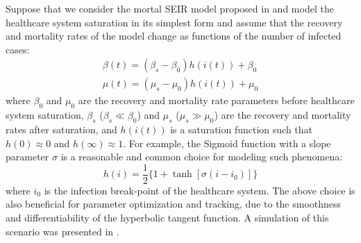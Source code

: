\documentclass[journal,a4paper,twocolumn]{IEEEtran}
\theoremstyle{definition}
\begin{document}
Suppose that we consider the mortal SEIR model proposed in \cite{sameni2020mathematical} and model the healthcare system saturation in its simplest form and assume that the recovery and mortality rates of the model change as functions of the number of infected cases:
\begin{equation}
    \begin{array}{l}
    \beta(t) = (\beta_s - \beta_0) h(i(t)) + \beta_0\\
    \mu(t) = (\mu_s - \mu_0) h(i(t)) + \mu_0    
    \end{array}
\end{equation}
where $\beta_0$ and $\mu_0$ are the recovery and mortality rate parameters before healthcare system saturation, $\beta_s$ ($\beta_s \ll \beta_0$) and $\mu_s$ ($\mu_s \gg \mu_0$) are the recovery and mortality rates after saturation, and $h(i(t))$ is a saturation function such that $h(0) \approx 0$ and $h(\infty) \approx 1$. For example, the Sigmoid function with a slope parameter $\sigma$ is a reasonable and common choice for modeling such phenomena:
\begin{equation}
    h(i) = \frac{1}{2}\{1 + \tanh{[\sigma(i - i_0)]}\} 
\end{equation}
where $i_0$ is the infection break-point of the healthcare system. The above choice is also beneficial for parameter optimization and tracking, due to the smoothness and differentiability of the hyperbolic tangent function. A simulation of this scenario was presented in \cite{sameni2020mathematical}.





\end{document}
